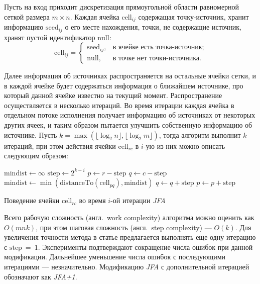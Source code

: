 \documentclass[12pt]{article}
\begin{document}
Пусть на вход приходит дискретизация прямоугольной области 
равномерной сеткой размера $m \times n$. Каждая ячейка $\mathrm{cell}_{ij}$ 
содержащая точку-источник, хранит информацию $\mathrm{seed}_{ij}$ о его месте нахождения,
точки, не содержащие источник, хранят пустой идентификатор ${\mathrm{null}}$:
$$
	\mathrm{cell}_{ij} = \left\lbrace
	\begin{array}{ll}
	\mathrm{seed}_{ij}, & \mbox{в ячейке есть точка-источник;} \\
	\mathrm{null}, & \mbox{в точке нет точки-источника.}
	\end{array}
	\right.
$$

Далее информация об источниках распространяется на остальные ячейки
сетки, и в каждой ячейке будет содержаться информация 
о ближайшем источнике, про который данной ячейке известно на текущий момент. 
Распространение осуществляется в несколько итераций. Во время итерации 
каждая ячейка в отдельном потоке исполнения получает информацию об 
источниках от некоторых других ячеек, и таким образом пытается улучшить
собственную информацию об источнике. Пусть  $k = \max(\lfloor\log_2n\rfloor, \lfloor\log_2m\rfloor)$, 
тогда алгоритм выполнит $k$ итераций, при этом действия ячейки $\mathrm{cell}_{rc}$ 
в $i$-ую из них можно описать следующим образом:

\begin{algorithm}
\begin{algorithmic}
\State $\mathrm{mindist} \leftarrow \infty$
\State $\mathrm{step} \gets 2^{k - i}$
\State $p \gets r - \mathrm{step}$
	\State $q \gets c - \mathrm{step}$
			\State $\mathrm{mindist} \gets 
 					\min(\mathrm{distanceTo}(\mathrm{cell}_{pq}), \mathrm{mindist})$
		\EndIf
		\State $q \gets q + \mathrm{step}$
 	\EndWhile
\State $p \gets p + \mathrm{step}$
\EndWhile
\end{algorithmic}
\caption{Поведение ячейки $\mathrm{cell}_{rc}$ во время $i$-ой итерации
\emph{JFA}}
\label{jfa_algo}
\end{algorithm}

Всего рабочую сложность (англ.~work complexity) алгоритма можно оценить 
как $O(m n k)$, при этом шаговая сложность (англ.~step complexity) --- $O(k)$. 
Для увеличения точности метода в статье предлагается выполнять 
еще одну итерацию с $\mathrm{step}~=~1$. Эксперименты подтверждают 
сокращение числа ошибок при данной модификации. Дальнейшее уменьшение числа 
ошибок с последующими итерациями --- незначительно. 
Модификацию \emph{JFA} с дополнительной итерацией обозначают как \emph{JFA+1}.
\end{document}

